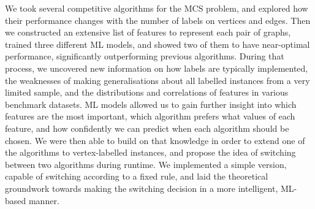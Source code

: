 \documentclass{l4proj}
\theoremstyle{definition}
\theoremstyle{remark}
\begin{document}
We took several competitive algorithms for the MCS problem, and explored how their
performance changes with the number of labels on vertices and edges. Then we
constructed an extensive list of features to represent each pair of graphs,
trained three different ML models, and showed two of them to have near-optimal
performance, significantly outperforming previous algorithms. During that
process, we uncovered new information on how labels are typically implemented,
the weaknesses of making generalisations about all labelled instances from a
very limited sample, and the distributions and correlations of features in
various benchmark datasets. ML models allowed us to gain further insight into
which features are the most important, which algorithm prefers what values of
each feature, and how confidently we can predict when each algorithm should be
chosen. We were then able to build on that knowledge in order to extend one of
the algorithms to vertex-labelled instances, and propose the idea of switching
between two algorithms during runtime. We implemented a simple version, capable
of switching according to a fixed rule, and laid the theoretical groundwork
towards making the switching decision in a more intelligent, ML-based manner.

\end{document}
